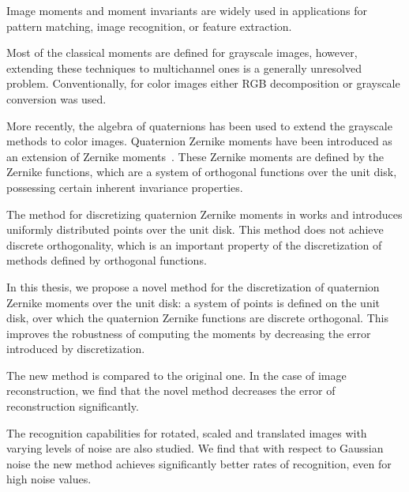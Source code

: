Image moments and moment invariants are widely used in applications for pattern matching, image recognition, or feature extraction.

Most of the classical moments are defined for grayscale images, however, extending these techniques to multichannel ones is a generally unresolved problem. Conventionally, for color images either RGB decomposition or grayscale conversion was used.

More recently, the algebra of quaternions has been used to extend the grayscale methods to color images. Quaternion Zernike moments have been introduced as an extension of Zernike moments~\cite{qzm}. These Zernike moments are defined by the Zernike functions, which are a system of orthogonal functions over the unit disk, possessing certain inherent invariance properties.

The method for discretizing quaternion Zernike moments in works \cite{qzm} and \cite{qzmi} introduces uniformly distributed points over the unit disk. This method does not achieve discrete orthogonality, which is an important property of the discretization of methods defined by orthogonal functions.

In this thesis, we propose a novel method for the discretization of quaternion Zernike moments over the unit disk: a system of points is defined on the unit disk, over which the quaternion Zernike functions are discrete orthogonal. This improves the robustness of computing the moments by decreasing the error introduced by discretization.

The new method is compared to the original one. In the case of image reconstruction, we find that the novel method decreases the error of reconstruction significantly.

The recognition capabilities for rotated, scaled and translated images with varying levels of noise are also studied. We find that with respect to Gaussian noise the new method achieves significantly better rates of recognition, even for high noise values.